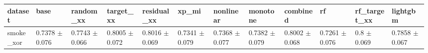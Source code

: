 \begin{tabular}{llllllllllll}
\toprule
dataset & base & random\_xx & target\_xx & residual\_xx & xp\_mi & nonlinear & monotone & combined & rf & rf\_target\_xx & lightgbm \\
\midrule
smoke\_xor & 0.7378 $\pm$ 0.076 & 0.7743 $\pm$ 0.066 & 0.8005 $\pm$ 0.072 & 0.8016 $\pm$ 0.069 & 0.7341 $\pm$ 0.079 & 0.7368 $\pm$ 0.077 & 0.7382 $\pm$ 0.079 & 0.8002 $\pm$ 0.068 & 0.7261 $\pm$ 0.076 & 0.8 $\pm$ 0.069 & 0.7858 $\pm$ 0.067 \\
\bottomrule
\end{tabular}
